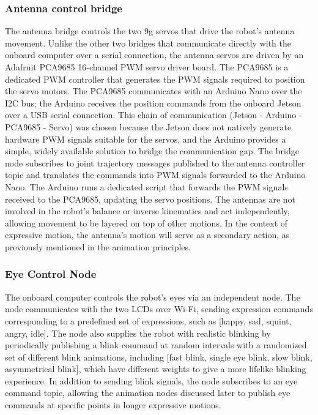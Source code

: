\subsubsection*{Antenna control bridge}
The antenna bridge controls the two 9g servos that drive the robot's antenna movement. Unlike the other two bridges that communicate directly with the onboard computer over a serial connection, the antenna servos are driven by an Adafruit PCA9685 16-channel PWM servo driver board. The PCA9685 is a dedicated PWM controller that generates the PWM signals required to position the servo motors. The PCA9685 communicates with an Arduino Nano over the I2C bus; the Arduino receives the position commands from the onboard Jetson over a USB serial connection. This chain of communication (Jetson - Arduino - PCA9685 - Servo) was chosen because the Jetson does not natively generate hardware PWM signals suitable for the servos, and the Arduino provides a simple, widely available solution to bridge the communication gap. The bridge node subscribes to joint trajectory messages published to the antenna controller topic and translates the commands into PWM signals forwarded to the Arduino Nano. The Arduino runs a dedicated script that forwards the PWM signals received to the PCA9685, updating the servo positions. The antennas are not involved in the robot's balance or inverse kinematics and act independently, allowing movement to be layered on top of other motions. In the context of expressive motion, the antenna's motion will serve as a secondary action, as previously mentioned in the animation principles.

\subsubsection*{Eye Control Node}
The onboard computer controls the robot's eyes via an independent node. The node communicates with the two LCDs over Wi-Fi, sending expression commands corresponding to a predefined set of expressions, such as [happy, sad, squint, angry, idle]. The node also supplies the robot with realistic blinking by periodically publishing a blink command at random intervals with a randomized set of different blink animations, including [fast blink, single eye blink, slow blink, asymmetrical blink], which have different weights to give a more lifelike blinking experience. In addition to sending blink signals, the node subscribes to an eye command topic, allowing the animation nodes discussed later to publish eye commands at specific points in longer expressive motions.

